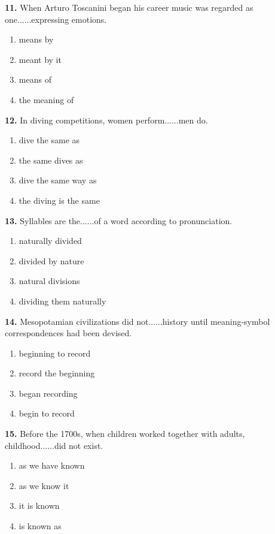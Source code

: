 \documentclass[12pt]{article}
\begin{document}
\par
\vspace{0.25\baselineskip}
\noindent\textbf{11.} When Arturo Toscanini began his career music was regarded as one......expressing emotions.
\begin{enumerate}[label=(\Alph*),leftmargin=*,itemsep=0.2em]
\item means by
\item meant by it
\item means of
\item the meaning of
\end{enumerate}
\par
\vspace{0.25\baselineskip}
\noindent\textbf{12.} In diving competitions, women perform......men do.
\begin{enumerate}[label=(\Alph*),leftmargin=*,itemsep=0.2em]
\item dive the same as
\item the same dives as
\item dive the same way as
\item the diving is the same
\end{enumerate}
\par
\vspace{0.25\baselineskip}
\noindent\textbf{13.} Syllables are the......of a word according to pronunciation.
\begin{enumerate}[label=(\Alph*),leftmargin=*,itemsep=0.2em]
\item naturally divided
\item divided by nature
\item natural divisions
\item dividing them naturally
\end{enumerate}
\par
\vspace{0.25\baselineskip}
\noindent\textbf{14.} Mesopotamian civilizations did not......history until meaning-symbol correspondences had been devised.
\begin{enumerate}[label=(\Alph*),leftmargin=*,itemsep=0.2em]
\item beginning to record
\item record the beginning
\item began recording
\item begin to record
\end{enumerate}
\par
\vspace{0.25\baselineskip}
\noindent\textbf{15.} Before the 1700s, when children worked together with adults, childhood......did not exist.
\begin{enumerate}[label=(\Alph*),leftmargin=*,itemsep=0.2em]
\item as we have known
\item as we know it
\item it is known
\item is known as
\end{enumerate}
\par
\vspace{0.25\baselineskip}
\end{document}
